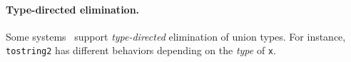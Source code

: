 \begin{comment}
\paragraph*{Single branch elimination.}

A possible approach is to use an elimination of an expression with a union type
$[[A \/ B]]$ that supports only one branch. The branch needs to have the same
type when the expression has type $[[A]]$, or type $[[B]]$. This approach is
adopted, for example by \citet{pierce1991programming},
\citet{barbanera1995intersection}, and more recently,
\citet{dunfield2014elaborating}. For consistency with the presentation of this thesis,
we adapt their syntax
using our switch notation in the examples, while preserving their semantics. For
example, in \lstinline{tostring2}, the expression \lstinline{show y} must return
\lstinline{String} when \lstinline{y : String}, and when \lstinline{y : Int},
which means that \lstinline{show} must be overloaded. In
\citet{pierce1991programming,dunfield2014elaborating,barbanera1995intersection},
this can be implemented by requiring \lstinline{show} to have an
\textit{intersection type} such as $[[(String -> String) /\ (Int -> String)]]$.
Then we can just write:

\begin{lstlisting}
function tostring2 (x: String | Int) : String = switch (x)
                                                  y -> show y
\end{lstlisting}

\noindent This implementation is concise, but it is also restrictive as it can no longer
support multiple branches according to the different representations of
\lstinline{x}. Furthermore it relies on the language also supporting overloaded
functions. Without overloaded functions the construct would not be very useful.
\end{comment}

\paragraph*{Type-directed elimination.}
Some systems~\citep{castagna:settheoretic} support
\textit{type-directed} elimination of union types. For instance,
\lstinline{tostring2} has different behaviors depending on the \textit{type} of
\lstinline{x}.

